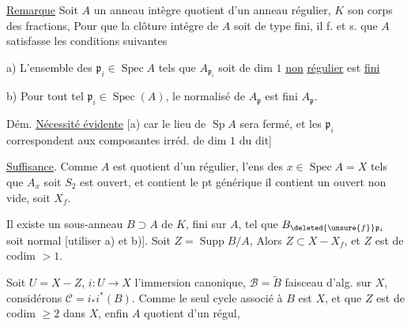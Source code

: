 \uline{Remarque} Soit $A$ un anneau intègre quotient d'un anneau régulier, $K$ son corps des fractions,  Pour que la clôture intégre de $A$ soit de type fini, il f. et s. que $A$ satisfasse les conditions suivantes

a) L'ensemble des $\mathfrak p_i\in\operatorname{Spec} A$ tels que $A_{\mathfrak p_i}$ soit de dim $1$ \uline{non} \uline{régulier} est \uline{fini}

b) Pour tout tel $\mathfrak p_i\in\operatorname{Spec}(A)$,  le normalisé de $A_{\mathfrak p}$ est fini  $A_{\mathfrak p}$.

Dém. \uline{Nécessité évidente} [a) car le lieu   de $\operatorname{Sp} A$ sera fermé, et les $\mathfrak p_i$ correspondent aux composantes irréd. de dim $1$ du dit]

\uline{Suffisance}.  Comme $A$ est quotient d'un régulier, l'ens des $x\in\operatorname{Spec} A=X$ tels que $A_x$ soit $S_2$ est ouvert, et contient le pt générique  il contient un ouvert non vide, soit $X_f$.

Il existe  un sous-anneau $B\supset A$ de $K$, fini sur $A$,  tel que  $B_{\deleted{\unsure{f}}\mathfrak p_i}$ soit normal [utiliser a) et b)]. Soit $Z=\operatorname{Supp} B/A$, Alors $Z\subset X-X_f$, et $Z$ est de codim $>1$.

Soit $U=X-Z$, $i:U\longrightarrow X$ l'immersion canonique, $\mathscr B=\widetilde B$ faisceau d'alg. sur $X$, considérons  $\mathcal C=i_*i^*(B)$. Comme le seul cycle  associé à $B$ est $X$, et que $Z$ est de codim $\geq2$ dans $X$, enfin $A$ quotient d'un régul,

